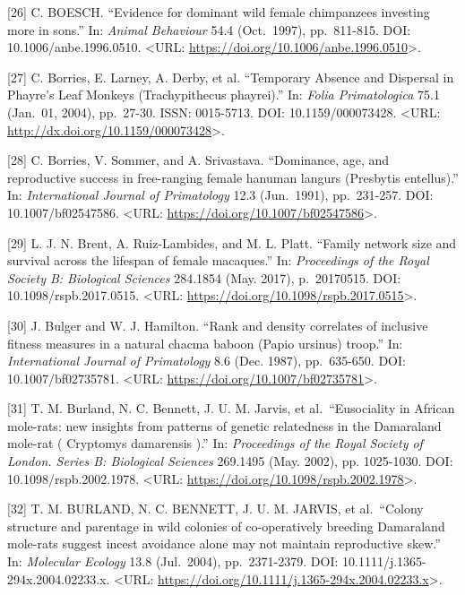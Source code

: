 \documentclass[
]{article}
\begin{document}
{[}26{]} C. BOESCH. ``Evidence for dominant wild female chimpanzees
investing more in sons.'' In: \emph{Animal Behaviour} 54.4 (Oct.~1997),
pp.~811-815. DOI: 10.1006/anbe.1996.0510. \textless URL:
\url{https://doi.org/10.1006/anbe.1996.0510}\textgreater.

{[}27{]} C. Borries, E. Larney, A. Derby, et al. ``Temporary Absence and
Dispersal in Phayre's Leaf Monkeys (Trachypithecus phayrei).'' In:
\emph{Folia Primatologica} 75.1 (Jan.~01, 2004), pp.~27-30. ISSN:
0015-5713. DOI: 10.1159/000073428. \textless URL:
\url{http://dx.doi.org/10.1159/000073428}\textgreater.

{[}28{]} C. Borries, V. Sommer, and A. Srivastava. ``Dominance, age, and
reproductive success in free-ranging female hanuman langurs (Presbytis
entellus).'' In: \emph{International Journal of Primatology} 12.3
(Jun.~1991), pp.~231-257. DOI: 10.1007/bf02547586. \textless URL:
\url{https://doi.org/10.1007/bf02547586}\textgreater.

{[}29{]} L. J. N. Brent, A. Ruiz-Lambides, and M. L. Platt. ``Family
network size and survival across the lifespan of female macaques.'' In:
\emph{Proceedings of the Royal Society B: Biological Sciences} 284.1854
(May. 2017), p.~20170515. DOI: 10.1098/rspb.2017.0515. \textless URL:
\url{https://doi.org/10.1098/rspb.2017.0515}\textgreater.

{[}30{]} J. Bulger and W. J. Hamilton. ``Rank and density correlates of
inclusive fitness measures in a natural chacma baboon (Papio ursinus)
troop.'' In: \emph{International Journal of Primatology} 8.6 (Dec.
1987), pp.~635-650. DOI: 10.1007/bf02735781. \textless URL:
\url{https://doi.org/10.1007/bf02735781}\textgreater.

{[}31{]} T. M. Burland, N. C. Bennett, J. U. M. Jarvis, et
al.~``Eusociality in African mole-rats: new insights from patterns of
genetic relatedness in the Damaraland mole-rat ( Cryptomys damarensis
).'' In: \emph{Proceedings of the Royal Society of London. Series B:
Biological Sciences} 269.1495 (May. 2002), pp. 1025-1030. DOI:
10.1098/rspb.2002.1978. \textless URL:
\url{https://doi.org/10.1098/rspb.2002.1978}\textgreater.

{[}32{]} T. M. BURLAND, N. C. BENNETT, J. U. M. JARVIS, et al.~``Colony
structure and parentage in wild colonies of co-operatively breeding
Damaraland mole-rats suggest incest avoidance alone may not maintain
reproductive skew.'' In: \emph{Molecular Ecology} 13.8 (Jul.~2004),
pp.~2371-2379. DOI: 10.1111/j.1365-294x.2004.02233.x. \textless URL:
\url{https://doi.org/10.1111/j.1365-294x.2004.02233.x}\textgreater.
\end{document}
